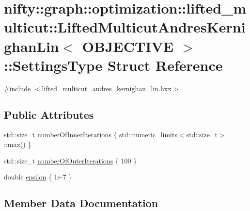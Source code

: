 \hypertarget{structnifty_1_1graph_1_1optimization_1_1lifted__multicut_1_1LiftedMulticutAndresKernighanLin_1_1SettingsType}{}\section{nifty\+:\+:graph\+:\+:optimization\+:\+:lifted\+\_\+multicut\+:\+:Lifted\+Multicut\+Andres\+Kernighan\+Lin$<$ O\+B\+J\+E\+C\+T\+I\+V\+E $>$\+:\+:Settings\+Type Struct Reference}
\label{structnifty_1_1graph_1_1optimization_1_1lifted__multicut_1_1LiftedMulticutAndresKernighanLin_1_1SettingsType}


{\ttfamily \#include $<$lifted\+\_\+multicut\+\_\+andres\+\_\+kernighan\+\_\+lin.\+hxx$>$}

\subsection*{Public Attributes}
\begin{DoxyCompactItemize}
\item 
std\+::size\+\_\+t \hyperlink{structnifty_1_1graph_1_1optimization_1_1lifted__multicut_1_1LiftedMulticutAndresKernighanLin_1_1SettingsType_ad670bd68d4ef80f3d99abb7d006cce0d}{number\+Of\+Inner\+Iterations} \{ std\+::numeric\+\_\+limits$<$std\+::size\+\_\+t$>$\+::max() \}
\item 
std\+::size\+\_\+t \hyperlink{structnifty_1_1graph_1_1optimization_1_1lifted__multicut_1_1LiftedMulticutAndresKernighanLin_1_1SettingsType_ae35728132164f566b1c30238bd39619d}{number\+Of\+Outer\+Iterations} \{ 100 \}
\item 
double \hyperlink{structnifty_1_1graph_1_1optimization_1_1lifted__multicut_1_1LiftedMulticutAndresKernighanLin_1_1SettingsType_ad5766889b9c95305aa51088b8a59786c}{epsilon} \{ 1e-\/7 \}
\end{DoxyCompactItemize}


\subsection{Member Data Documentation}
\hypertarget{structnifty_1_1graph_1_1optimization_1_1lifted__multicut_1_1LiftedMulticutAndresKernighanLin_1_1SettingsType_ad5766889b9c95305aa51088b8a59786c}{}
